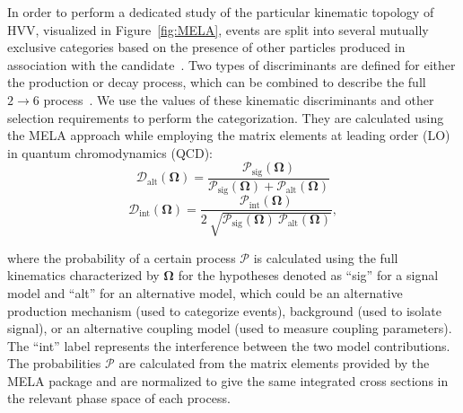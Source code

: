 
In order to perform a dedicated study of the particular kinematic topology of HVV, visualized in Figure~\ref{fig:MELA}, events are split into several mutually exclusive categories based on the presence of other particles produced in association with the \Hboson candidate~\cite{Sirunyan:2021rug}. Two types of discriminants are defined for either the production or decay process, which can be combined to describe the full $2\to 6$ process~\cite{Sirunyan:2017exp,Sirunyan:2017tqd,Sirunyan:2019twz,Sirunyan:2021rug}. We use the values of these kinematic discriminants and other selection requirements to perform the categorization. They are calculated using the MELA approach while employing the matrix elements at leading order (LO) in quantum chromodynamics (QCD):
\begin{equation}
	\mathcal{D}_\mathrm{alt}\left(\boldsymbol{\Omega}\right) = \frac{\mathcal{P}_\text{sig}\left(\boldsymbol{\Omega}\right) }
	{\mathcal{P}_\text{sig}\left(\boldsymbol{\Omega}\right) +\mathcal{P}_\mathrm{alt}\left(\boldsymbol{\Omega}\right) }
	\label{eq:melaD}
\end{equation}
\begin{equation}
	\mathcal{D}_\mathrm{int}\left(\boldsymbol{\Omega}\right) =
	\frac{\mathcal{P}_\mathrm{int}\left(\boldsymbol{\Omega}\right) }
	{2 \ \sqrt{{\mathcal{P}_\text{sig}\left(\boldsymbol{\Omega}\right) \ \mathcal{P}_\mathrm{alt}\left(\boldsymbol{\Omega}\right) }}},
	\label{eq:melaDint}
\end{equation}

where the probability of a certain process $\mathcal{P}$ is calculated using the full kinematics characterized
by $\boldsymbol{\Omega}$ for the hypotheses denoted as ``sig'' for a signal model and ``alt'' for an alternative model,
which could be an alternative \Hboson production mechanism (used to categorize events),
background (used to isolate signal), or an alternative \Hboson coupling model (used to measure coupling parameters).
The ``int'' label represents the interference between the two model contributions.
The probabilities $\mathcal{P}$ are calculated from the matrix elements provided by the MELA package and
are normalized to give the same integrated cross sections in the relevant phase space of each process.

